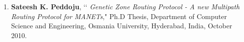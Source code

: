 \begin{enumerate}%
			\item
			\textbf{Sateesh K. Peddoju}, \lq\lq
			\emph{Genetic Zone Routing Protocol - A new Multipath Routing Protocol for MANETs}," Ph.D Thesis, Department of Computer Science and Engineering, Osmania University, Hyderabad, India, October 2010.
			
		\end{enumerate}
